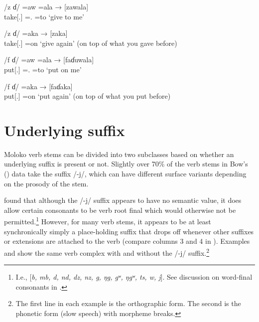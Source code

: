 \ea \label{ex:6:1}
/z ɗ/ \hspace{29pt} =aw \hspace{5pt}  =ala  \hspace{1pt} → \hspace{3pt} [zawala]\\
\glt  take[{\twoS}.{\IMP}]  ={\oneS}.{\IO}   =to   \hspace{25pt}   ‘give to me’\\
\z

\ea \label{ex:6:2}
/z ɗ/ \hspace{31pt} =aka   \hspace{24pt}    → \hspace{3pt} [zaka]\\
\glt  take[{\twoS}.{\IMP}]  =on    \hspace{50pt}     ‘give again’ (on top of what you gave before)
\z

\ea \label{ex:6:3}
/f ɗ/ \hspace{27pt} =aw \hspace{5pt} =ala  \hspace{1pt}   → \hspace{3pt} [faɗuwala]\\
\glt  put[{\twoS}.{\IMP}]    ={\oneS}.{\IO}  =to   \hspace{25pt}    ‘put on me’
\z

\ea \label{ex:6:4}
/f ɗ/ \hspace{29pt} =aka   \hspace{24pt}    → \hspace{3pt} [faɗaka]\\
\glt  put[{\twoS}.{\IMP}]  =on    \hspace{50pt}     ‘put again’ (on top of what you put before)
\z

\section{Underlying suffix}\label{sec:6.3}
\hypertarget{RefHeading1211941525720847}{}
Moloko verb stems can be divided into two subclasses based on whether an underlying suffix is present or not. Slightly over 70\% of the verb stems in Bow’s (\citeyear{Bow1997c}) data take the suffix /-j/, which can have different surface variants depending on the prosody of the stem. 

\citeyear{FriesenMamalis2008} found that although the /-j/ suffix appears to have no semantic value, it does allow certain consonants to be verb root final which would otherwise not be permitted.\footnote{I.e., [\textit{b, mb, d, nd, dz, nz, g, ŋg, gʷ, ŋgʷ, ts, w, j}]. See discussion on word-final consonants in .}  However, for many verb stems, it appears to be at least synchronically simply a place-holding suffix that drops off whenever other suffixes or extensions are attached to the verb (compare columns 3 and 4 in ). Examples  and  show the same verb complex with  and without  the /-j/ suffix.\footnote{The first line in each example is the orthographic form. The second is the phonetic form (slow speech) with morpheme breaks.}


